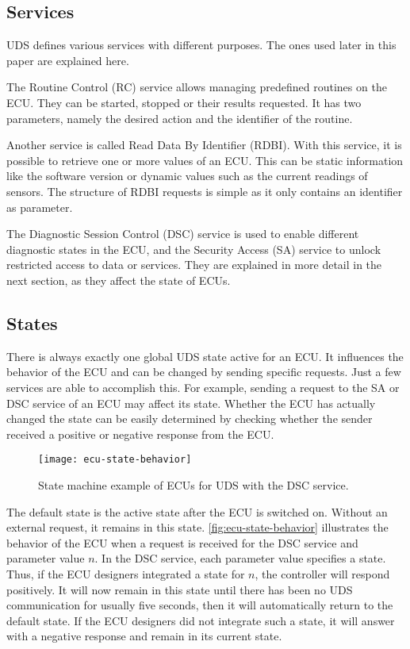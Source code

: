 \subsection{Services}
\label{subsubsec:uds-services}

UDS defines various services with different purposes. The ones used later in this paper are explained here.

The Routine Control (RC) service allows managing predefined routines on the ECU. They can be started, stopped or their results requested. It has two parameters, namely the desired action and the identifier of the routine.

Another service is called Read Data By Identifier (RDBI). With this service, it is possible to retrieve one or more values of an ECU. This can be static information like the software version or dynamic values such as the current readings of sensors. The structure of RDBI requests is simple as it only contains an identifier as parameter.

The Diagnostic Session Control (DSC) service is used to enable different diagnostic states in the ECU, and the Security Access (SA) service to unlock restricted access to data or services. They are explained in more detail in the next section, as they affect the state of ECUs.

\subsection{States}
\label{subsec:states}

There is always exactly one global UDS state active for an ECU. It influences the behavior of the ECU and can be changed by sending specific requests. Just a few services are able to accomplish this. For example, sending a request to the SA or DSC service of an ECU may affect its state. Whether the ECU has actually changed the state can be easily determined by checking whether the sender received a positive or negative response from the ECU.

\begin{figure}[htb]
    \centering
    \texttt{[image: ecu-state-behavior]}
    \caption{State machine example of ECUs for UDS with the DSC service.}
    \label{fig:ecu-state-behavior}
\end{figure}

The default state is the active state after the ECU is switched on. Without an external request, it remains in this state. \autoref{fig:ecu-state-behavior} illustrates the behavior of the ECU when a request is received for the DSC service and parameter value $n$. In the DSC service, each parameter value specifies a state. Thus, if the ECU designers integrated a state for $n$, the controller will respond positively. It will now remain in this state until there has been no UDS communication for usually five seconds, then it will automatically return to the default state. If the ECU designers did not integrate such a state, it will answer with a negative response and remain in its current state.

